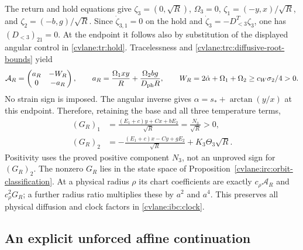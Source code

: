 The return and hold equations give
$\zeta_3=(0,\sqrt R)$, $\Omega_3=0$,
$\zeta_1=(-y,x)/\sqrt R$, and $\zeta_2=(-b,g)/\sqrt R$.
Since $\dot\zeta_{3,1}=0$ on the hold and
$\dot\zeta_3=-D_{<3}^T\zeta_3$, one has
$(D_{<3})_{21}=0$.  At the endpoint it follows also by substitution
of the displayed angular control in \eqref{cvlane:tr:hold}.  Tracelessness
and \eqref{cvlane:trc:diffusive-root-bounds} yield
\begin{equation}\label{cvlane:irc:triangular-return}
 \mathcal A_R=
 \begin{pmatrix}a_R&-W_R\\0&-a_R\end{pmatrix},\qquad
 a_R=\frac{\Omega_1xy}{R}
       +\frac{\Omega_2bg}{D_{\rm ph}R},\qquad
 W_R=2\dot\alpha+\Omega_1+\Omega_2
       \geq c_W\sigma_2/4>0.
\end{equation}
No strain sign is imposed.  The angular inverse gives
$\alpha=s_*+\arctan(y/x)$ at this endpoint.  Therefore, retaining
the base and all three temperature terms,
\begin{equation}\label{cvlane:irc:exact-return-temperature}
 \begin{aligned}
 (G_R)_1&=\frac{(E_1+c)y+Cx+bE_2}{\sqrt R}
          =\frac{N_3}{\sqrt R}>0,\\
 (G_R)_2&=-\frac{(E_1+c)x-Cy+gE_2}{\sqrt R}
             +K_3\Theta_3\sqrt R.
 \end{aligned}
\end{equation}
Positivity uses the proved positive component $N_3$, not an
unproved sign for $(G_R)_2$.  The nonzero $G_R$ lies in the state
space of Proposition~\ref{cvlane:irc:orbit-classification}.  At a physical
radius $\rho$ its chart coefficients are exactly
$c_\rho\mathcal A_R$ and $c_\rho^2G_R$; a further radius ratio
multiplies these by $a^2$ and $a^4$.  This preserves all physical
diffusion and clock factors in \eqref{cvlane:ibc:clock}.

\subsection{An explicit unforced affine continuation}

